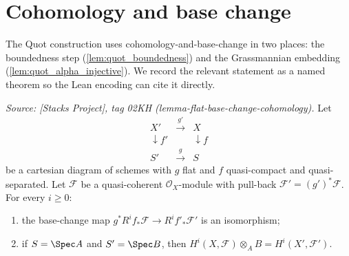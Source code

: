 \section{Cohomology and base change}
\label{sec:cohomology_base_change}

The Quot construction uses cohomology-and-base-change in two places: the
boundedness step (\cref{lem:quot_boundedness}) and the Grassmannian
embedding (\cref{lem:quot_alpha_injective}). We record the relevant
statement as a named theorem so the Lean encoding can cite it directly.

\begin{theorem}
  \label{thm:flat_base_change_cohomology}
  \textit{Source: [Stacks Project], tag 02KH (lemma-flat-base-change-cohomology).}
  Let
  \[
    \begin{array}{ccc}
      X' & \xrightarrow{g'} & X \\
      \downarrow f' &  & \downarrow f \\
      S' & \xrightarrow{g} & S
    \end{array}
  \]
  be a cartesian diagram of schemes with \(g\) flat and \(f\) quasi-compact and
  quasi-separated. Let \(\mathcal{F}\) be a quasi-coherent
  \(\mathcal{O}_X\)-module with pull-back
  \(\mathcal{F}' = (g')^* \mathcal{F}\). For every \(i \ge 0\):
  \begin{enumerate}
    \item the base-change map
      \(g^* R^i f_* \mathcal{F} \to R^i f'_* \mathcal{F}'\) is an isomorphism;
    \item if \(S = \Spec A\) and \(S' = \Spec B\), then \(H^i(X, \mathcal{F})
      \otimes_A B = H^i(X', \mathcal{F}')\).
  \end{enumerate}
\end{theorem}

